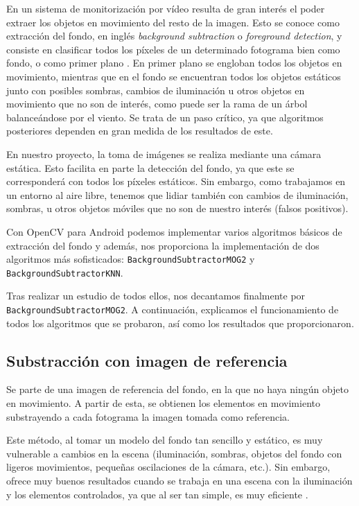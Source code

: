 En un sistema de monitorización por vídeo resulta de gran interés el
poder extraer los objetos en movimiento del resto de la imagen. Esto se
conoce como extracción del fondo, en inglés \emph{background
subtraction} o \emph{foreground detection}, y consiste en clasificar
todos los píxeles de un determinado fotograma bien como fondo, o como
primer plano \citep{wiki:bs}. En primer plano se engloban todos los
objetos en movimiento, mientras que en el fondo se encuentran todos los
objetos estáticos junto con posibles sombras, cambios de iluminación u
otros objetos en movimiento que no son de interés, como puede ser la
rama de un árbol balanceándose por el viento. Se trata de un paso
crítico, ya que algoritmos posteriores dependen en gran medida de los
resultados de este.

En nuestro proyecto, la toma de imágenes se realiza mediante una cámara
estática. Esto facilita en parte la detección del fondo, ya que este se
corresponderá con todos los píxeles estáticos. Sin embargo, como
trabajamos en un entorno al aire libre, tenemos que lidiar también con
cambios de iluminación, sombras, u otros objetos móviles que no son de
nuestro interés (falsos positivos).

Con OpenCV para Android podemos implementar varios algoritmos básicos de
extracción del fondo y además, nos proporciona la implementación de dos
algoritmos más sofisticados: \texttt{BackgroundSubtractorMOG2} y \\
\texttt{BackgroundSubtractorKNN}. 

Tras realizar un estudio de todos
ellos, nos decantamos finalmente por \texttt{BackgroundSubtractorMOG2}.
A continuación, explicamos el funcionamiento de todos los algoritmos que
se probaron, así como los resultados que proporcionaron.

\subsection{Substracción con imagen de referencia}\label{substraccion-con-imagen-de-referencia}

Se parte de una imagen de referencia del fondo, en la que no haya ningún
objeto en movimiento. A partir de esta, se obtienen los elementos en
movimiento substrayendo a cada fotograma la imagen tomada como
referencia.

Este método, al tomar un modelo del fondo tan sencillo y estático, es
muy vulnerable a cambios en la escena (iluminación, sombras, objetos del
fondo con ligeros movimientos, pequeñas oscilaciones de la cámara,
etc.). Sin embargo, ofrece muy buenos resultados cuando se trabaja en
una escena con la iluminación y los elementos controlados, ya que al ser
tan simple, es muy eficiente \citep{programarfacil:detmov}.

